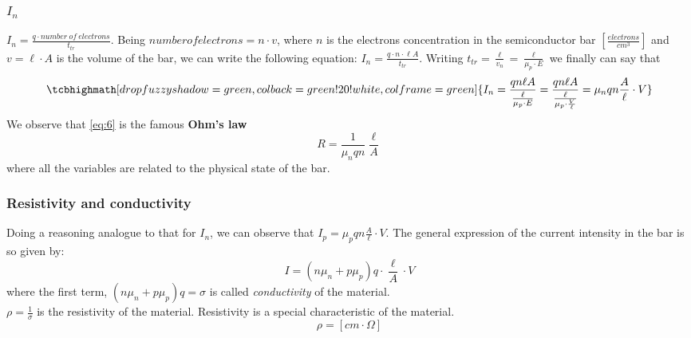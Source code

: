\documentclass[12pt]{article}
\newcommand{\B}{\textbf}
\newcommand{\I}{\textit}
\begin{document}
\subsubsection{$I_n$}
$I_n = \frac{q \cdot number \ of \ electrons}{t_{tr}}$. Being $number of electrons = n \cdot v$, where $n$ is the electrons concentration in the semiconductor bar $[\frac{electrons}{cm^3}]$ and $v= \ell \cdot A$ is the volume of the bar, we can write the following equation: $I_n = \frac{q \cdot n \cdot \ell A}{t_{tr}}$. Writing $t_{tr} = \frac{\ell}{v_n} = \frac{\ell}{\mu_p \cdot E}$ we finally can say that
\begin{equation} \label{eq:6}
\tcbhighmath[drop fuzzy shadow = green, colback = green!20!white, colframe = green]{
	I_n = \frac{q n \ell A}{\frac{\ell}{\mu_p \cdot E}} = \frac{q n \ell A}{\frac{\ell}{\mu_p \cdot \frac{V}{\ell}}}= \mu_n qn\frac{A}{\ell}\cdot V}
\end{equation}
We observe that \ref{eq:6} is the famous \B{Ohm's law} 
\begin{equation}
R = \frac{1}{\mu_n q n}\frac{\ell}{A}
\end{equation}
where all the variables are related to the physical state of the bar.
\subsubsection{Resistivity and conductivity}
Doing a reasoning analogue to that for $I_n$, we can observe that $I_p = \mu_p qn\frac{A}{\ell}\cdot V$. The general expression of the current intensity in the bar is so given by:
\begin{equation}
I = (n\mu_n+p\mu_p)q\cdot \frac{\ell}{A} \cdot V
\end{equation}
where the first term, $(n\mu_n+p\mu_p)q = \sigma $ is called \I{conductivity} of the material.\\
$\rho = \frac{1}{\sigma}$ is the resistivity of the material. 
Resistivity is a special characteristic of the material. 
\begin{equation}
\rho = [cm \cdot \Omega]
\end{equation}
\end{document}
